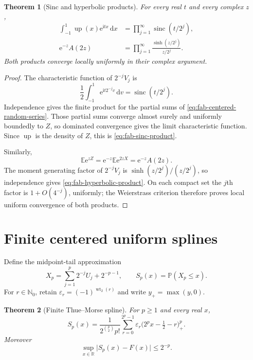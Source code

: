 \documentclass[11pt,oneside,openany]{book}
\newtheorem{theorem}{Theorem}[chapter]
\theoremstyle{definition}
\theoremstyle{remark}
\newcommand{\R}{\mathbb R}
\newcommand{\N}{\mathbb N}
\newcommand{\e}{\mathrm e}
\newcommand{\dd}{\,\mathrm d}
\newcommand{\abs}[1]{\lvert #1\rvert}
\newcommand{\E}{\mathbb E}
\newcommand{\Prob}{\mathbb P}
\newcommand{\sinc}{\operatorname{sinc}}
\begin{document}
\begin{theorem}[Sinc and hyperbolic products]
\label{thm:fab-sinc-product}
For every real $t$ and every complex $z$,
\begin{align}
 \int_{-1}^{1}\operatorname{up}(x)\e^{\mathrm i tx}\dd x
 &=\prod_{j=1}^{\infty}\sinc(t/2^j),
 \label{eq:fab-sinc-product}\\
 \e^{-z}A(2z)
 &=\prod_{j=1}^{\infty}
   \frac{\sinh(z/2^j)}{z/2^j}.
 \label{eq:fab-hyperbolic-product}
\end{align}
Both products converge locally uniformly in their complex argument.
\end{theorem}

\begin{proof}
The characteristic function of $2^{-j}V_j$ is
\[
 \frac12\int_{-1}^{1}\e^{\mathrm i t2^{-j}v}\dd v
 =\sinc(t/2^j).
\]
Independence gives the finite product for the partial sums of
\eqref{eq:fab-centered-random-series}.  Those partial sums converge almost
surely and uniformly boundedly to $Z$, so dominated convergence gives the
limit characteristic function.  Since $\operatorname{up}$ is the density of
$Z$, this is \eqref{eq:fab-sinc-product}.

Similarly,
\[
 \E\e^{zZ}=\e^{-z}\E\e^{2zX}=\e^{-z}A(2z).
\]
The moment generating factor of $2^{-j}V_j$ is
$\sinh(z/2^j)/(z/2^j)$, so independence gives
\eqref{eq:fab-hyperbolic-product}.  On each compact set the $j$th factor is
$1+O(4^{-j})$, uniformly; the Weierstrass criterion therefore proves local
uniform convergence of both products.
\end{proof}

\section{Finite centered uniform splines}

Define the midpoint-tail approximation
\begin{equation}
 X_p=\sum_{j=1}^{p}2^{-j}U_j+2^{-p-1},
 \qquad
 S_p(x)=\Prob(X_p\le x).
 \label{eq:fab-centered-spline-def}
\end{equation}
For $r\in\N_0$, retain $\varepsilon_r=(-1)^{\operatorname{wt}_2(r)}$ and
write $y_+=\max(y,0)$.

\begin{theorem}[Finite Thue--Morse spline]
\label{thm:fab-centered-spline}
For $p\ge1$ and every real $x$,
\begin{equation}
 \boxed{
 S_p(x)=\frac1{2^{\binom p2}p!}
 \sum_{r=0}^{2^p-1}\varepsilon_r
 \bigl(2^px-\tfrac12-r\bigr)_+^p.}
 \label{eq:fab-centered-spline}
\end{equation}
Moreover
\begin{equation}
 \sup_{x\in\R}\abs{S_p(x)-F(x)}\le2^{-p}.
 \label{eq:fab-centered-spline-error}
\end{equation}
\end{theorem}
\end{document}
